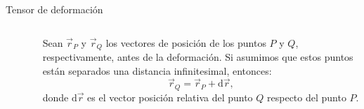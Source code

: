 \documentclass[11pt,handout,aspectratio=1610]{beamer}
\newcommand{\diff}[0]{\text{d}}
\begin{document}
\begin{frame}{Tensor de deformación}
\begin{columns}
\begin{column}{0.45\textwidth}
\begin{figure}
            \end{figure}
        \end{column}
        \begin{column}{0.45\textwidth}
            Sean $\vec{r}_P$ y $\vec{r}_Q$ los vectores de posición de los puntos $P$ y $Q$, respectivamente, antes de la deformación. Si asumimos que estos puntos están separados una distancia infinitesimal, entonces: $$ \vec{r}_Q = \vec{r}_P + \diff \vec{r},$$ donde $\diff \vec{r}$ es el vector posición relativa del punto $Q$ respecto del punto $P$.
        \end{column}
    \end{columns}

\end{frame}
\end{document}
